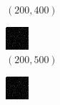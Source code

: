 \documentclass[a4paper, landscape]{article}
\begin{document}
\begin{figure}[H]
\begin{subfigure}{0.07\linewidth}
        \caption*{$(200, 400)$}
    \end{subfigure}
    \begin{subfigure}{0.07\linewidth}
        \centering
        \includegraphics[width=\linewidth]{omp/k = 200, m = 500.png}
        \caption*{$(200, 500)$}
    \end{subfigure}
    \begin{subfigure}{0.07\linewidth}
        \centering
        \includegraphics[width=\linewidth]{omp/k = 200, m = 600.png}

\end{subfigure}
\end{figure}
\end{document}
